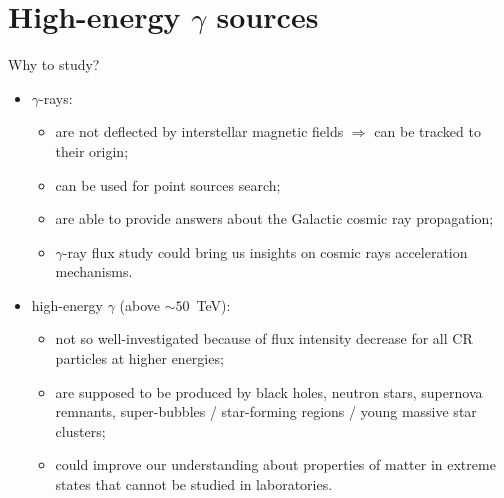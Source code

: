 
\begin{frame}
\titlepage
\end{frame}

\section{High-energy \texorpdfstring{$\gamma$}{gamma} sources}

\begin{frame}{Why to study?}
  \begin{itemize}
    \item $\gamma$-rays:
    \begin{itemize}
	\item are not deflected by interstellar magnetic fields $\Rightarrow$ can be tracked to their origin;
	\item can be used for point sources search;
	\item are able to provide answers about the Galactic cosmic ray propagation;
	\item $\gamma$-ray flux study could bring us insights on cosmic rays acceleration mechanisms.
    \end{itemize}
    \item high-energy $\gamma$ (above $\sim50$~TeV):
    \begin{itemize}
	\item not so well-investigated because of flux intensity decrease for all CR particles at higher energies;
	\item are supposed to be produced by black holes, neutron stars, supernova remnants, super-bubbles / star-forming regions / young massive star clusters;
	\item could improve our understanding about properties of matter in extreme states that cannot be studied in laboratories.
    \end{itemize}
  \end{itemize}
\end{frame}

